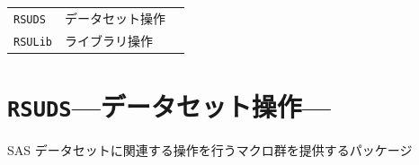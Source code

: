 \section{\DocStrTitlePackageListInCategory}
\begin{center}
\begin{xltabular}{\textwidth}{|p{2truecm}|X|p{2truecm}|}
\hline
\thead{\DocStrHeaderPackageName}&\thead{\DocStrHeaderPackagePurpose}&\thead{\DocStrRefto}\\
\hline
\hline
\texttt{RSUDS}&データセット操作&\\
\hline
\texttt{RSULib}&ライブラリ操作&\\
\hline
\end{xltabular}
\end{center}
\section{\texttt{RSUDS}\;---\;データセット操作\;---}\label{sec:RSUDS}
SAS データセットに関連する操作を行うマクロ群を提供するパッケージ
